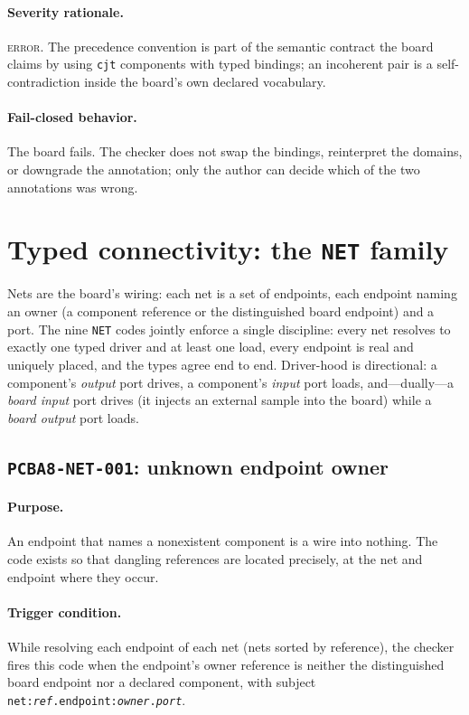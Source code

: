 \paragraph{Severity rationale.} \textsc{error}. The precedence convention is part of the semantic contract the board claims by using \texttt{cjt} components with typed bindings; an incoherent pair is a self-contradiction inside the board's own declared vocabulary.

\paragraph{Fail-closed behavior.} The board fails. The checker does not swap the bindings, reinterpret the domains, or downgrade the annotation; only the author can decide which of the two annotations was wrong.

\section{Typed connectivity: the \texttt{NET} family}\label{ch07:sec:net}

Nets are the board's wiring: each net is a set of endpoints, each endpoint naming an owner (a component reference or the distinguished board endpoint) and a port. The nine \texttt{NET} codes jointly enforce a single discipline: every net resolves to exactly one typed driver and at least one load, every endpoint is real and uniquely placed, and the types agree end to end. Driver-hood is directional: a component's \emph{output} port drives, a component's \emph{input} port loads, and---dually---a \emph{board input} port drives (it injects an external sample into the board) while a \emph{board output} port loads.

\subsection{\texttt{PCBA8-NET-001}: unknown endpoint owner}\label{ch07:sub:net001}

\paragraph{Purpose.} An endpoint that names a nonexistent component is a wire into nothing. The code exists so that dangling references are located precisely, at the net and endpoint where they occur.

\paragraph{Trigger condition.} While resolving each endpoint of each net (nets sorted by reference), the checker fires this code when the endpoint's owner reference is neither the distinguished board endpoint nor a declared component, with subject \texttt{net:\emph{ref}.endpoint:\emph{owner}.\emph{port}}.

